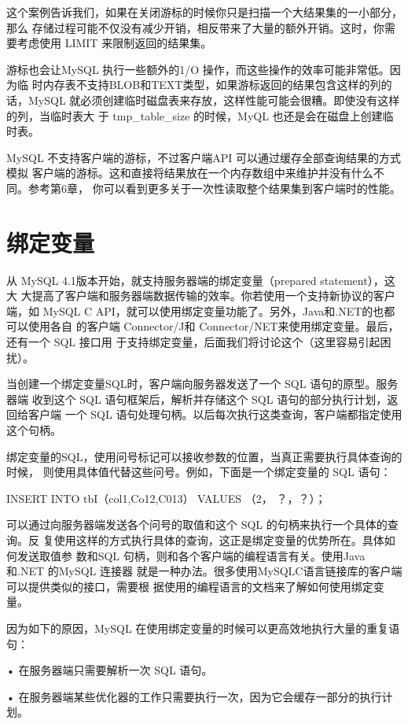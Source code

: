 这个案例告诉我们，如果在关闭游标的时候你只是扫描一个大结果集的一小部分，那么
存储过程可能不仅没有减少开销，相反带来了大量的额外开销。这时，你需要考虑使用
LIMIT 来限制返回的结果集。

游标也会让MySQL 执行一些额外的1/O 操作，而这些操作的效率可能非常低。因为临
时内存表不支持BLOB和TEXT类型，如果游标返回的结果包含这样的列的话，MySQL
就必须创建临时磁盘表来存放，这样性能可能会很糟。即使没有这样的列，当临时表大
于 tmp\_table\_size 的时候，MyQL 也还是会在磁盘上创建临时表。

MySQL 不支持客户端的游标，不过客户端API 可以通过缓存全部查询结果的方式模拟
客户端的游标。这和直接将结果放在一个内存数组中来维护并没有什么不同。参考第6章，
你可以看到更多关于一次性读取整个结果集到客户端时的性能。

\section{绑定变量}
从 MySQL 4.1版本开始，就支持服务器端的绑定变量（prepared statement），这大
大提高了客户端和服务器端数据传输的效率。你若使用一个支持新协议的客户端，如
MySQL C API，就可以使用绑定变量功能了。另外，Java和.NET的也都可以使用各自
的客户端 Connector/J和 Connector/NET来使用绑定变量。最后，还有一个 SQL 接口用
于支持绑定变量，后面我们将讨论这个（这里容易引起困扰）。

当创建一个绑定变量SQL时，客户端向服务器发送了一个 SQL 语句的原型。服务器端
收到这个 SQL 语句框架后，解析并存储这个 SQL 语句的部分执行计划，返回给客户端
一个 SQL 语句处理句柄。以后每次执行这类查询，客户端都指定使用这个句柄。

绑定变量的SQL，使用问号标记可以接收参数的位置，当真正需要执行具体查询的时候，
则使用具体值代替这些问号。例如，下面是一个绑定变量的 SQL 语句：

INSERT INTO tbI（col1,Co12,C013） VALUES （2， ？，？）；

可以通过向服务器端发送各个问号的取值和这个 SQL 的句柄来执行一个具体的查询。反
复使用这样的方式执行具体的查询，这正是绑定变量的优势所在。具体如何发送取值参
数和SQL 句柄，则和各个客户端的编程语言有关。使用Java 和.NET 的MySQL 连接器
就是一种办法。很多使用MySQLC语言链接库的客户端可以提供类似的接口，需要根
据使用的编程语言的文档来了解如何使用绑定变量。

因为如下的原因，MySQL 在使用绑定变量的时候可以更高效地执行大量的重复语句：

• 在服务器端只需要解析一次 SQL 语句。

• 在服务器端某些优化器的工作只需要执行一次，因为它会缓存一部分的执行计划。

